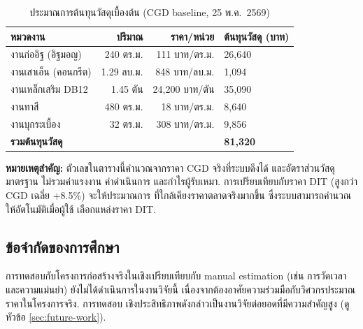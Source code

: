 \begin{table}[H]
  \centering
  \footnotesize
  \caption{ประมาณการต้นทุนวัสดุเบื้องต้น (CGD baseline, 25 พ.ค.\ 2569)}
  \label{tab:case-estimate}
  \begin{tabular}{lrrl}
    \toprule
    หมวดงาน & ปริมาณ & ราคา/หน่วย & ต้นทุนวัสดุ (บาท) \\
    \midrule
    งานก่ออิฐ (อิฐมอญ)     & 240 ตร.ม. & 111 บาท/ตร.ม. & 26{,}640 \\
    งานเสาเอ็น (คอนกรีต)   & 1.29 ลบ.ม. & 848 บาท/ลบ.ม. & 1{,}094 \\
    งานเหล็กเสริม DB12      & 1.45 ตัน & 24{,}200 บาท/ตัน & 35{,}090 \\
    งานทาสี                 & 480 ตร.ม. & 18 บาท/ตร.ม. & 8{,}640 \\
    งานบุกระเบื้อง          & 32 ตร.ม. & 308 บาท/ตร.ม. & 9{,}856 \\
    \midrule
    \textbf{รวมต้นทุนวัสดุ} & & & \textbf{81{,}320} \\
    \bottomrule
  \end{tabular}
\end{table}

\textbf{หมายเหตุสำคัญ:} ตัวเลขในตารางนี้คำนวณจากราคา CGD จริงที่ระบบดึงได้
และอัตราส่วนวัสดุมาตรฐาน ไม่รวมค่าแรงงาน ค่าดำเนินการ และกำไรผู้รับเหมา.
การเปรียบเทียบกับราคา DIT (สูงกว่า CGD เฉลี่ย $+$8.5\%) จะให้ประมาณการ
ที่ใกล้เคียงราคาตลาดจริงมากขึ้น ซึ่งระบบสามารถคำนวณให้อัตโนมัติเมื่อผู้ใช้
เลือกแหล่งราคา DIT.

\subsection{ข้อจำกัดของการศึกษา}

การทดสอบกับโครงการก่อสร้างจริงในเชิงเปรียบเทียบกับ manual estimation
(เช่น การวัดเวลาและความแม่นยำ) ยังไม่ได้ดำเนินการในงานวิจัยนี้
เนื่องจากต้องอาศัยความร่วมมือกับวิศวกรประมาณราคาในโครงการจริง. การทดสอบ
เชิงประสิทธิภาพดังกล่าวเป็นงานวิจัยต่อยอดที่มีความสำคัญสูง
(ดูหัวข้อ \ref{sec:future-work}).
